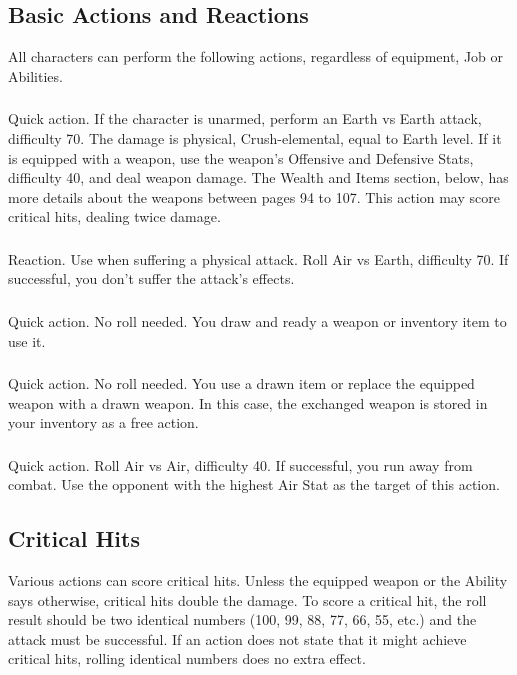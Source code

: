 \begin{multicols}{2}
\subsection{Basic Actions and Reactions}\label{subsec:basicactions}
All characters can perform the following actions, regardless of equipment, Job or Abilities.

\subsubsection{}
Quick action. If the character is unarmed, perform an Earth vs Earth attack, difficulty 70. The damage is physical, Crush-elemental, equal to Earth level. If it is equipped with a weapon, use the weapon’s Offensive and Defensive Stats, difficulty 40, and deal weapon damage. The Wealth and Items section, below, has more details about the weapons between pages 94 to 107. This action may score critical hits, dealing twice damage.

\subsubsection{}
Reaction. Use when suffering a physical attack. Roll Air vs Earth, difficulty 70. If successful, you don’t suffer the attack’s effects.

\subsubsection{}
Quick action. No roll needed. You draw and ready a weapon or inventory item to use it.

\subsubsection{}
Quick action. No roll needed. You use a drawn item or replace the equipped weapon with a drawn weapon. In this case, the exchanged weapon is stored in your inventory as a free action.

\subsubsection{}
Quick action. Roll Air vs Air, difficulty 40. If successful, you run away from combat. Use the opponent with the highest Air Stat as the target of this action.

\subsection{Critical Hits}
Various actions can score critical hits. Unless the equipped weapon or the Ability says otherwise, critical hits double the damage. To score a critical hit, the roll result should be two identical numbers (100, 99, 88, 77, 66, 55, etc.) and the attack must be successful. If an action does not state that it might achieve critical hits, rolling identical numbers does no extra effect.


\end{multicols}
